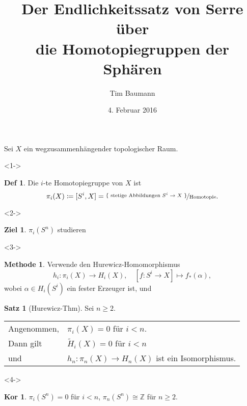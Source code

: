 \documentclass{beamer}
\title{Der Endlichkeitssatz von Serre über \\ die Homotopiegruppen der Sphären}
\author{Tim Baumann}
\institute{Universität Augsburg}
\date{4. Februar 2016}
\newcommand{\Z}{\mathbb{Z}} %
\theoremstyle{definition}
\newtheorem*{defn}{Def} %
\newtheorem*{ziel}{Ziel}
\newtheorem*{satz}{Satz}
\newtheorem*{methode}{Methode}
\newtheorem*{kor}{Kor} %
\renewcommand{\emph}[1]{\textcolor{Emph}{#1}}
\begin{document}

\begin{frame}
  \titlepage
\end{frame}

\begin{frame}[t]
  Sei $X$ ein wegzusammenhängender topologischer Raum.
  
  \begin{onlyenv}<1->
  \begin{defn}
    Die \emph{$i$-te Homotopiegruppe} von $X$ ist
    \[
      \pi_i(X) \coloneqq [S^i, X] = \nicefrac{\{ \text{ stetige Abbildungen $S^i \to X$ } \}}{\text{Homotopie}}.
    \]
  \end{defn}
  \end{onlyenv}
  
  \begin{onlyenv}<2->
  \vspace{-1em}
  \begin{ziel}
    $\pi_i(S^n)$ studieren
  \end{ziel}
  \end{onlyenv}
  
  \begin{onlyenv}<3->
  \begin{methode}
    Verwende den \emph{Hurewicz-Homomorphismus}
    \[
      h_i : \pi_i(X) \to H_i(X), \quad
      [f : S^i \to X] \mapsto f_*(\alpha),
    \]
    wobei $\alpha \in H_i(S^i)$ ein fester Erzeuger ist, und
  \end{methode}
  
  \begin{satz}[Hurewicz-Thm]
    Sei $n \geq 2$.

    \begin{tabular}{l l}
      Angenommen, & $\pi_i(X) = 0$ \enspace für $i < n$. \\
      Dann gilt & $\widetilde{H}_i(X) = 0$ \enspace für $i < n$ \\
      und & $h_n : \pi_n(X) \to H_n(X)$ ist ein Isomorphismus.
    \end{tabular}
  \end{satz}
  \end{onlyenv}
  
  \begin{onlyenv}<4->
    \begin{kor}
      $\pi_i(S^n) = 0$ für $i < n$, \quad
      $\pi_n(S^n) \cong \Z$ für $n \geq 2$.
    \end{kor}
  \end{onlyenv}
\end{frame}
\end{document}

